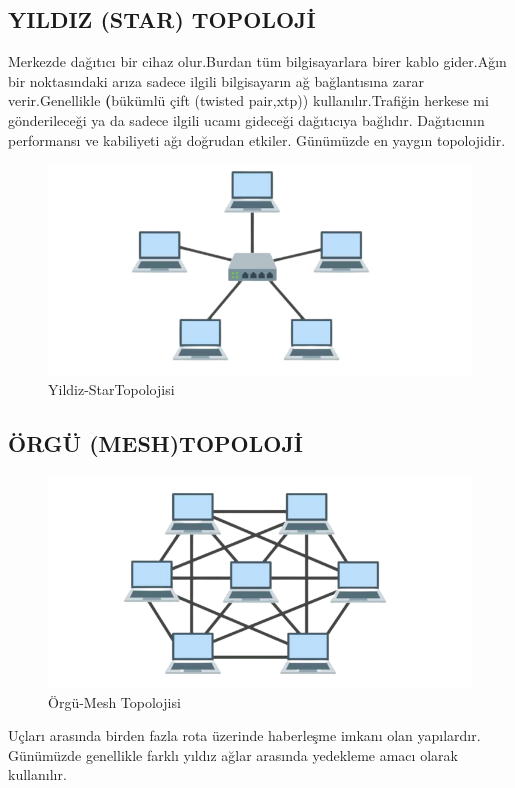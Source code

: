 \subsection*{YILDIZ (STAR) TOPOLOJİ}
Merkezde dağıtıcı bir cihaz olur.Burdan tüm bilgisayarlara birer kablo gider.Ağın bir noktasındaki arıza sadece ilgili bilgisayarın ağ bağlantısına zarar verir.Genellikle \textbf(bükümlü çift (twisted pair,xtp)) kullanılır.Trafiğin herkese mi gönderileceği ya da sadece ilgili ucamı gideceği dağıtıcıya bağlıdır.
Dağıtıcının  performansı ve kabiliyeti ağı doğrudan  etkiler.
Günümüzde en yaygın topolojidir.
\begin{figure}[!ht]
    \includegraphics{images/star-Topology-1024x512-removebg-preview}
    \caption{Yildiz-StarTopolojisi}
   \label{fig:yildiz_topolojisi}
  \end{figure}

\subsection*{ÖRGÜ (MESH)TOPOLOJİ}
\begin{figure}[!ht]
 \includegraphics{images/mesh-topology-1-1024x512-removebg-preview}
    \caption{Örgü-Mesh Topolojisi}
   \label{fig:Orgu_mesh_topolojisi}
  \end{figure}
Uçları arasında birden fazla rota üzerinde haberleşme imkanı olan yapılardır.
Günümüzde genellikle farklı yıldız ağlar arasında yedekleme amacı olarak kullanılır.


